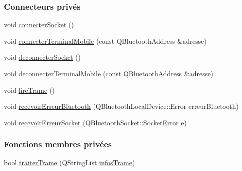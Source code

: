 \subsubsection*{Connecteurs privés}
\begin{DoxyCompactItemize}
\item 
void \hyperlink{class_communication_a1ef7e4107d98346290f19f76d7eecf32}{connecter\+Socket} ()
\item 
void \hyperlink{class_communication_a9640339b93f4a99f80426b7345615037}{connecter\+Terminal\+Mobile} (const Q\+Bluetooth\+Address \&adresse)
\item 
void \hyperlink{class_communication_a5280c11bea5ead32e7a7101fd5b0f9b2}{deconnecter\+Socket} ()
\item 
void \hyperlink{class_communication_aeeb47bc3c4d7419fefb737168638442e}{deconnecter\+Terminal\+Mobile} (const Q\+Bluetooth\+Address \&adresse)
\item 
void \hyperlink{class_communication_ad99afe857470e6e95432b3adcb97fea2}{lire\+Trame} ()
\item 
void \hyperlink{class_communication_adbbab5630096d6374c4d7e52508b8a37}{recevoir\+Erreur\+Bluetooth} (Q\+Bluetooth\+Local\+Device\+::\+Error erreur\+Bluetooth)
\item 
void \hyperlink{class_communication_a94a9c34e683d590fc6abbc4111a57f29}{recevoir\+Erreur\+Socket} (Q\+Bluetooth\+Socket\+::\+Socket\+Error e)
\end{DoxyCompactItemize}
\subsubsection*{Fonctions membres privées}
\begin{DoxyCompactItemize}
\item 
bool \hyperlink{class_communication_a1f17fd8330b55b3ab30263d15e6e740b}{traiter\+Trame} (Q\+String\+List \hyperlink{class_communication_a219fe9a4cd04470241f26f1f6159d721}{infos\+Trame})
\end{DoxyCompactItemize}
